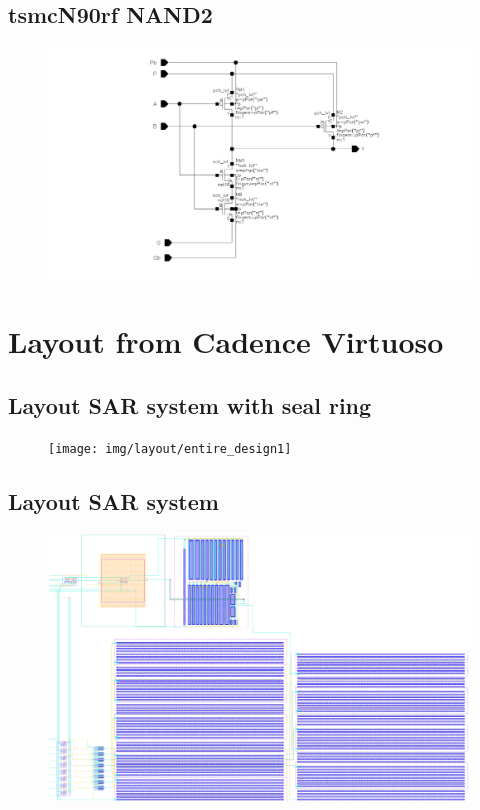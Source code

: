 \documentclass[english, 12pt, a4paper]{ifimaster}
\begin{document}
\begin{appendices}
\section{tsmcN90rf NAND2}
\begin{figure}[!ht]
 \centering
 \includegraphics[width=20cm, angle=90]{img/tsmcN90rf_nand2_lvt_schem}
\end{figure}



\chapter{Layout from Cadence Virtuoso}

\newpage
\section{Layout SAR system with seal ring}
\begin{figure}[!ht]
 \centering
 \texttt{[image: img/layout/entire\_design1]}
\end{figure}

\newpage
\section{Layout SAR system}
\begin{figure}[!ht]
 \centering
 \includegraphics[width=20cm, angle=90]{img/layout/entire_design2}
\end{figure}


\end{appendices}
\end{document}
